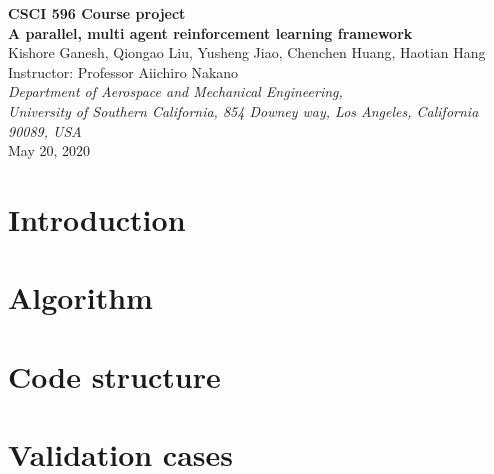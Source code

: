 \documentclass[12Pt]{article}
\begin{document}
\begin{center}
{\bf \Large{CSCI 596 Course project}} \\[2ex]
{\bf \Large{A parallel, multi agent reinforcement learning framework}} \\[2ex]
{Kishore Ganesh, Qiongao Liu, Yusheng Jiao, Chenchen Huang, Haotian Hang}\\[2ex]
{Instructor: Professor Aiichiro Nakano}\\[2ex]
{\textit{Department of Aerospace and Mechanical Engineering,  \\ University of Southern California, 854 Downey way, Los Angeles, California 90089, USA
}}\\[2ex]
May 20, 2020\\

\vspace{0.1in}

\end{center}

\section{Introduction}\label{sec:intro}

\section{Algorithm}\label{sec:alg}

\section{Code structure}\label{sec:code}

\section{Validation cases}\label{sec:case}


 
\end{document}
